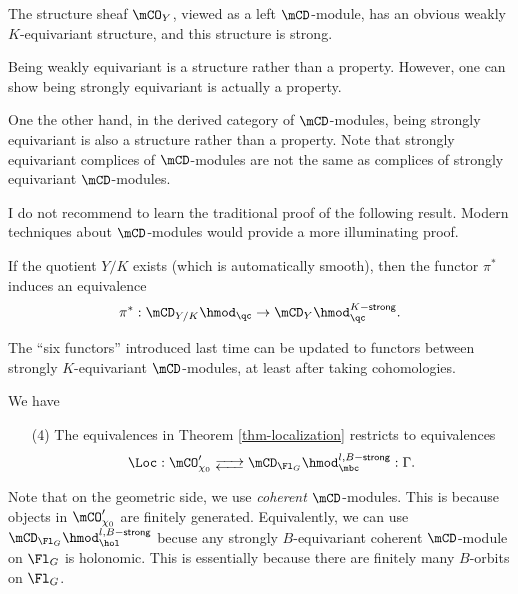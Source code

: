 	\begin{exam}
		The structure sheaf $\mCO_Y$, viewed as a left $\mCD$-module, has an obvious weakly $K$-equivariant structure, and this structure is strong.
	\end{exam}

	\begin{rem}
		Being weakly equivariant is a structure rather than a property. However, one can show being strongly equivariant is actually a property.

		One the other hand, in the derived category of $\mCD$-modules, being strongly equivariant is also a structure rather than a property. Note that strongly equivariant complices of $\mCD$-modules are not the same as complices of strongly equivariant $\mCD$-modules.
	\end{rem}

	I do not recommend to learn the traditional proof of the following result. Modern techniques about $\mCD$-modules would provide a more illuminating proof.

	\begin{prop}
		If the quotient $Y/K$ exists (which is automatically smooth), then the functor $\pi^*$ induces an equivalence
		\[
			\pi^*: \mCD_{Y/K}\hmod_\qc \to \mCD_Y\hmod_\qc^{K-\mathsf{strong}}.
		\]

	\end{prop}

	\begin{exam}
		The ``six functors'' introduced last time can be updated to functors between strongly $K$-equivariant $\mCD$-modules, at least after taking cohomologies.
	\end{exam}

	\begin{thm}
		We have
		\begin{itemize}
			\item[(4)]
				The equivalences in Theorem \ref{thm-localization} restricts to equivalences
				\[
					\Loc: \mCO_{\chi_0}' \adj \mCD_{\Fl_G}\hmod_\mbc^{l,B-\mathsf{strong}} : \Gamma.
				\]
		\end{itemize}
		
	\end{thm}

	\begin{rem}
		Note that on the geometric side, we use \emph{coherent} $\mCD$-modules. This is because objects in $\mCO_{\chi_0}' $ are finitely generated. Equivalently, we can use $\mCD_{\Fl_G}\hmod_\hol^{l,B-\mathsf{strong}}$ becuse any strongly $B$-equivariant coherent $\mCD$-module on $\Fl_G$ is holonomic. This is essentially because there are finitely many $B$-orbits on $\Fl_G$.
	\end{rem}

